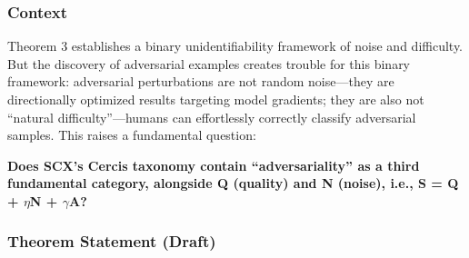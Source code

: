 \documentclass[
  12pt,
]{article}
\begin{document}
\subsubsection{Context}\label{context-ar}

Theorem 3 establishes a binary unidentifiability framework of noise and difficulty. But the discovery of adversarial examples creates trouble for this binary framework: adversarial perturbations are not random noise---they are directionally optimized results targeting model gradients; they are also not ``natural difficulty''---humans can effortlessly correctly classify adversarial samples. This raises a fundamental question:

\textbf{Does SCX's Cercis taxonomy contain ``adversariality'' as a third fundamental category, alongside Q (quality) and N (noise), i.e., S = Q + $\eta$N + $\gamma$A?}

\subsubsection{Theorem Statement (Draft)}\label{ar-statement}
\end{document}
